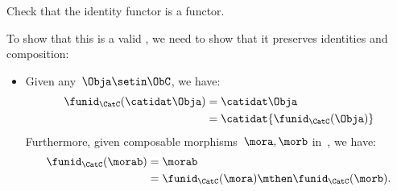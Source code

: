 \begin{exercise}
    Check that the identity functor is a functor.
\end{exercise}
\begin{solution}
    To show that this is a valid , we need to show that it preserves identities and composition:
    \begin{itemize}
        \item Given any~$\Obja \setin \ObC$, we have:
              \begin{equation}
                  \begin{aligned}
                      \funid_{\CatC}(\catidat\Obja) & =\catidat\Obja \\
                                                    & =\catidat{\funid_{\CatC}(\Obja)}
                  \end{aligned}
              \end{equation}
              Furthermore, given composable morphisms~$\mora,\morb$ in~\CatC, we have:
              \begin{equation}
                  \begin{aligned}
                      \funid_{\CatC}(\morab) & =\morab \\
                                             & =\funid_{\CatC}(\mora)\mthen \funid_{\CatC} (\morb).
                  \end{aligned}
              \end{equation}
    \end{itemize}
\end{solution}


